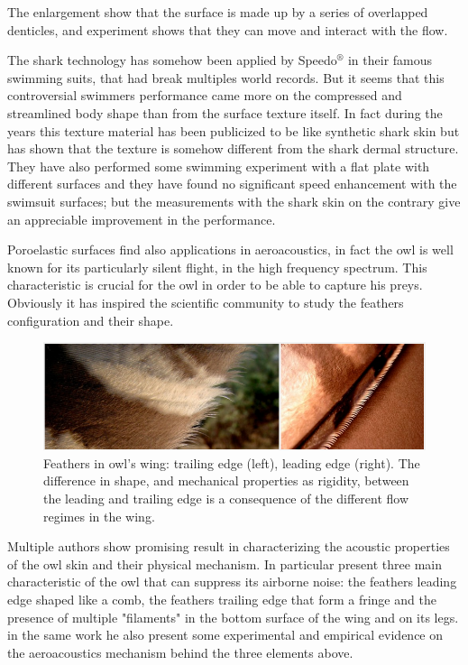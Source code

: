 The enlargement show that the surface is made up by a series of overlapped denticles, and experiment shows that they can move and interact with the flow.

The shark technology has somehow been applied by Speedo$^{\circledR}$ in their famous swimming suits, that had break multiples world records.
But it seems that this controversial swimmers performance came more on the compressed and streamlined body shape than from the surface texture itself.
In fact during the years this texture material has been publicized to be like synthetic shark skin but \cite{Oeffner785} has shown that the texture is somehow different from the shark dermal structure.
They have also performed some swimming experiment with a flat plate with different surfaces and they have found no significant speed enhancement with the swimsuit surfaces; but the measurements with the shark skin on the contrary give an appreciable improvement in the performance.


Poroelastic surfaces find also applications in aeroacoustics, in fact the owl is well known for its particularly silent flight, in the high frequency spectrum.
This characteristic is crucial for the owl in order to be able to capture his preys.
Obviously it has inspired the scientific community to study the feathers configuration and their shape.

\begin{figure}[h]
	\centering
	\includegraphics[width=0.8\linewidth]{chapter_1/howl}
	\caption{Feathers in owl's wing: trailing edge (left), leading edge (right). The difference in shape, and mechanical properties as rigidity, between the leading and trailing edge is a consequence of the different flow regimes in the wing.}
	\label{fig:owl}
\end{figure}
 
Multiple authors show promising result in characterizing the acoustic properties of the owl skin and their physical mechanism.
In particular \cite{lilley1998} present three main characteristic of the owl that can suppress its airborne noise: the feathers leading edge shaped like a comb, the feathers trailing edge that form a fringe and the presence of multiple "filaments" in the bottom surface of the wing and on its legs.
in the same work he also present some experimental and empirical evidence on the aeroacoustics mechanism behind the three elements above.

